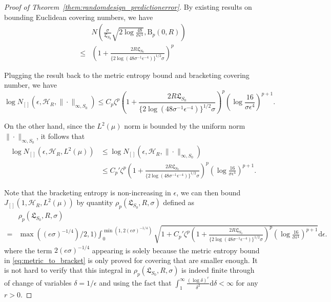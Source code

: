 \documentclass[11pt]{article}
\numberwithin{equation}{section}
\newcommand{\diff}{\mathrm{d}} %
\newcommand{\ball}{\mathrm{B}}
\newcommand{\errrd}{\rho}
\newcommand{\lipsz}{\mathfrak{L}}
\begin{document}
\begin{appendices}
\begin{proof}[Proof of Theorem~\ref{them:randomdesign_predictionerror}]
By existing results on bounding Euclidean covering numbers, we have
\[
\begin{split}
& N( \frac{\sigma}{\lipsz_{S_0}}\sqrt{2 \log\frac{48}{\sigma\epsilon^{4}}} , \ball_p(0,R))\\
\leq &  \left(1+ \frac{2R \lipsz_{S_0}}{\{2 \log(48\sigma^{-1}\epsilon^{-4})\}^{1/2} \sigma} \right)^p
\end{split}
\]

Plugging the result back to the metric entropy bound and bracketing covering number, we have
\[
\log N_{[]}(\epsilon, \mathcal{H}_R, \| \cdot\|_{\infty,S_0}) \leq 
C_p \zeta^p  \left(1+ \frac{2R \lipsz_{S_0}}{\{2 \log(48\sigma^{-1}\epsilon^{-4})\}^{1/2} \sigma} \right)^p  \left(\log \frac{16}{\sigma \epsilon^4}\right)^{p+1}.
\]

On the other hand, since the $L^2(\mu)$ norm is bounded by the uniform norm $\| \cdot \|_{\infty,S_0}$, it follows that
\begin{equation}
\begin{split}
\log N_{[]}(\epsilon, \mathcal{H}_R, L^2(\mu))& \leq 
\log N_{[]}(\epsilon, \mathcal{H}_R, \| \cdot\|_{\infty,S_0})\\
&\leq C_p'\zeta^p  \left(1+ \frac{2R \lipsz_{S_0}}{\{2 \log(48\sigma^{-1}\epsilon^{-4})\}^{1/2} \sigma} \right)^p \left(\log \frac{16}{\sigma \epsilon^4}\right)^{p+1}.
\end{split}
\label{eq:bracketing_bound}
\end{equation}




Note that the bracketing entropy is non-increasing in $\epsilon$, we can then bound $J_{[]}(1,\mathcal{H}_R,L^2(\mu))$ by quantity $\errrd_p(\lipsz_{S_0},R,\sigma)$ defined as 
\[
\begin{split}
&\errrd_p(\lipsz_{S_0},R,\sigma)\\
=& \max((e\sigma)^{-1/4})/2,1) \int_{0}^{\min(1,2(e\sigma)^{-1/4}) }\sqrt{1+C_p'\zeta^p  \left(1+ \frac{2R \lipsz_{S_0}}{\{2 \log(48\sigma^{-1}\epsilon^{-4})\}^{1/2} \sigma} \right)^p \left(\log \frac{16}{\sigma \epsilon^4}\right)^{p+1} }\mathrm{d} \epsilon.
\end{split}
\]
where the term $2(e\sigma)^{-1/4}$ appearing is solely because the metric entropy bound in \eqref{eq:metric_to_bracket} is only proved for covering that are smaller enough. It is not hard to verify that this integral in $\errrd_p(\lipsz_{S_0},R,\sigma)$  is indeed finite through of change of variables $\delta = 1/\epsilon$ and using the fact that $\displaystyle \int_{1}^\infty \frac{(\log \delta)^r}{\delta^2} \diff \delta < \infty $ for any $r>0$.



\end{proof}
\end{appendices}
\end{document}
